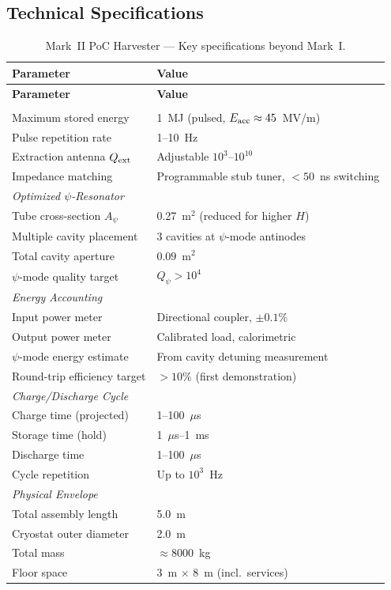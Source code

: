 \documentclass[11pt,a4paper]{article}
\begin{document}
\subsection{Technical Specifications}

\begin{longtable}{@{}p{6cm}p{8cm}@{}}
\caption{Mark~II PoC Harvester --- Key specifications beyond Mark~I.}
\label{tab:mk2} \\
\toprule
\textbf{Parameter} & \textbf{Value} \\
\midrule
\endfirsthead
\toprule
\textbf{Parameter} & \textbf{Value} \\
\midrule
\endhead
\bottomrule
\endfoot
\multicolumn{2}{l}{\textit{Enhanced EM System}} \\
\midrule
Maximum stored energy & 1~MJ (pulsed, $E_{\rm acc} \approx 45$~MV/m) \\
Pulse repetition rate & 1--10~Hz \\
Extraction antenna $Q_{\rm ext}$ & Adjustable $10^3$--$10^{10}$ \\
Impedance matching & Programmable stub tuner, $< 50$~ns switching \\
\midrule
\multicolumn{2}{l}{\textit{Optimized $\psi$-Resonator}} \\
\midrule
Tube cross-section $A_\psi$ & 0.27~m$^2$ (reduced for higher $H$) \\
Multiple cavity placement & 3 cavities at $\psi$-mode antinodes \\
Total cavity aperture & $0.09$~m$^2$ \\
$\psi$-mode quality target & $Q_\psi > 10^4$ \\
\midrule
\multicolumn{2}{l}{\textit{Energy Accounting}} \\
\midrule
Input power meter & Directional coupler, $\pm 0.1\%$ \\
Output power meter & Calibrated load, calorimetric \\
$\psi$-mode energy estimate & From cavity detuning measurement \\
Round-trip efficiency target & $> 10\%$ (first demonstration) \\
\midrule
\multicolumn{2}{l}{\textit{Charge/Discharge Cycle}} \\
\midrule
Charge time (projected) & 1--100~$\mu$s \\
Storage time (hold) & 1~$\mu$s--1~ms \\
Discharge time & 1--100~$\mu$s \\
Cycle repetition & Up to $10^3$~Hz \\
\midrule
\multicolumn{2}{l}{\textit{Physical Envelope}} \\
\midrule
Total assembly length & 5.0~m \\
Cryostat outer diameter & 2.0~m \\
Total mass & $\approx 8000$~kg \\
Floor space & 3~m $\times$ 8~m (incl.\ services) \\
\end{longtable}
\end{document}

